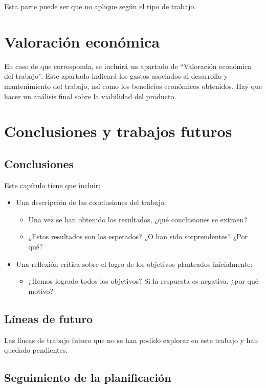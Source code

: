 \documentclass[IB,BIB]{TFUOC}%
\begin{document}
Esta parte puede ser que no aplique según el tipo de trabajo.

\chapter{Valoración económica}
En caso de que corresponda, se incluirá un apartado de ``Valoración económica del trabajo". Este apartado indicará los gastos asociados al desarrollo y mantenimiento del trabajo, así como los beneficios económicos obtenidos. Hay que hacer un análisis final sobre la viabilidad del producto.

\chapter{Conclusiones y trabajos futuros}

\section{Conclusiones}
Este capítulo tiene que incluir:
\begin{itemize}
\item Una descripción de las conclusiones del trabajo:
\begin{itemize}
    \item Una vez se han obtenido los resultados, ¿qué conclusiones se extraen?
    \item ¿Estos resultados son los esperados? ¿O han sido sorprendentes? ¿Por qué? 
\end{itemize}
\item Una reflexión crítica sobre el logro de los objetivos planteados inicialmente:
\begin{itemize}
    \item ¿Hemos logrado todos los objetivos? Si la respuesta es negativa, ¿por qué motivo?
\end{itemize}
\end{itemize}


\section{Líneas de futuro}
Las líneas de trabajo futuro que no se han podido explorar en este trabajo y han quedado pendientes.

\section{Seguimiento de la planificación}
\end{document}

